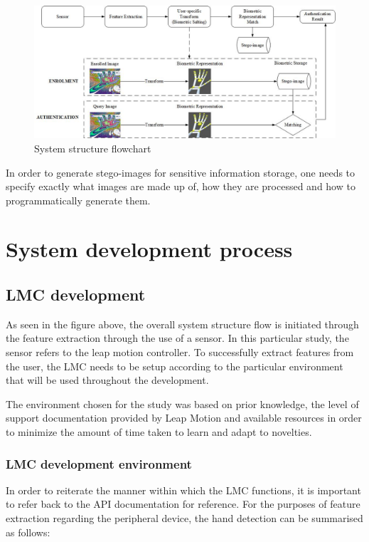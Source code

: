     \begin{figure}[htbp!] 
    \centering    
    \includegraphics[width=1.0\textwidth]{Chapter3/Figs/System_Structure_Flowchart.jpg}
    \caption[System structure flowchart]{System structure flowchart}
    \label{fig:System structure flowchart}
    \end{figure}
    
In order to generate stego-images for sensitive information storage, one needs to specify exactly what images are made up of, how they are processed and how to programmatically generate them.

\section{System development process}


\subsection{LMC development}

As seen in the figure above, the overall system structure flow is initiated through the feature extraction through the use of a sensor. In this particular study, the sensor refers to the leap motion controller. To successfully extract features from the user, the LMC needs to be setup according to the particular environment that will be used throughout the development. 

The environment chosen for the study was based on prior knowledge, the level of support documentation provided by Leap Motion and available resources in order to minimize the amount of time taken to learn and adapt to novelties. 

\subsubsection{LMC development environment}

In order to reiterate the manner within which the LMC functions, it is important to refer back to the API documentation for reference. For the purposes of feature extraction regarding the peripheral device, the hand detection can be summarised as follows:

